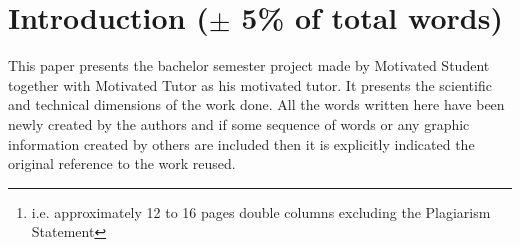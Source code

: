 \documentclass[conference,compsoc]{IEEEtran}
\begin{document}




\maketitle


\begin{abstract}
This document is a template for the scientific and technical (S\&T for short) report that is to be delivered by any BiCS student at the end of each Bachelor Semester Project (BSP). The Latex source files are available at:\\
\href{https://github.com/nicolasguelfi/lu.uni.course.bics.global}{{\underline{\textbf{https://github.com/nicolasguelfi/lu.uni.course.bics.global}}}}\\
  
This template is to be used using the Latex document preparation system or using any document preparation system. The whole document should be in between 6000 to 8000 words~\footnote{i.e. approximately 12 to 16 pages double columns excluding the Plagiarism Statement} (excluding the annexes) and the proportions must be preserved. The other documents to be delivered (summaries, \ldots) should have their format adapted from this template.\\

A tutor (or any person having contributed to the BSP work) is not a co-author per se for a student's work. It is possible to exploit a BSP report to produce a scientific and technical publication. In this case, the authors list has to be discussed and agreed with the concerned parties.

\end{abstract}


%
\IEEEpeerreviewmaketitle

\section{Introduction ($\pm$ 5\% of total words)}
This paper presents the bachelor semester project made by Motivated Student together with Motivated Tutor as his motivated tutor.
It presents the scientific and technical dimensions of the work done. All the words written here have been newly created by the authors and if some sequence of words or any graphic information created by others are included then it is explicitly indicated the original reference to the work reused. 
\end{document}
